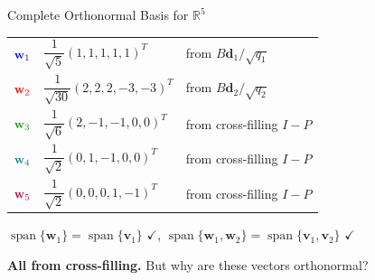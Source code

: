 \documentclass[10pt]{beamer}
\theoremstyle{definition}
\newcommand{\x}[1]{\alert{\textbf{#1}}}
\newcommand{\gn}[1]{{\color{green!60!black}#1}}       %
\newcommand{\rd}[1]{{\color{red}#1}}                  %
\newcommand{\bl}[1]{{\color{blue}#1}}                 %
\newcommand{\tl}[1]{{\color{teal}#1}}                 %
\begin{document}
\begin{frame}{Complete Orthonormal Basis for $\mathbb{R}^5$}

\begin{tabular}{r@{\;$=$\;}l@{\qquad}l}
$\bl{\mathbf{w}_1}$ & $\dfrac{1}{\sqrt{5}}(1,1,1,1,1)^T$ & from $B\mathbf{d}_1/\sqrt{q_1}$ \\[8pt]
$\rd{\mathbf{w}_2}$ & $\dfrac{1}{\sqrt{30}}(2,2,2,{-}3,{-}3)^T$ & from $B\mathbf{d}_2/\sqrt{q_2}$ \\[8pt]
$\gn{\mathbf{w}_3}$ & $\dfrac{1}{\sqrt{6}}(2,{-}1,{-}1,0,0)^T$ & from cross-filling $I - P$ \\[8pt]
$\tl{\mathbf{w}_4}$ & $\dfrac{1}{\sqrt{2}}(0,1,{-}1,0,0)^T$ & from cross-filling $I - P$ \\[8pt]
${\color{purple}\mathbf{w}_5}$ & $\dfrac{1}{\sqrt{2}}(0,0,0,1,{-}1)^T$ & from cross-filling $I - P$
\end{tabular}

\vspace{0.5em}

$\operatorname{span}\{\mathbf{w}_1\} = \operatorname{span}\{\mathbf{v}_1\}$ $\checkmark$, \quad $\operatorname{span}\{\mathbf{w}_1,\mathbf{w}_2\} = \operatorname{span}\{\mathbf{v}_1,\mathbf{v}_2\}$ $\checkmark$

\vspace{0.3em}

\x{All from cross-filling.} But why are these vectors orthonormal?

\end{frame}
\end{document}
